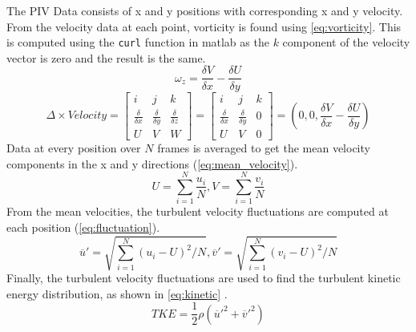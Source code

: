 The PIV Data consists of x and y positions with corresponding x and y velocity. From the velocity data at each point, vorticity is found using \autoref{eq:vorticity}. This is computed using the \verb|curl| function in \acrfull{matlab} as the $k$ component of the velocity vector is zero and the result is the same.
\begin{equation}\label{eq:vorticity}
    \omega _z = \frac{\delta V}{\delta x} - \frac{\delta U}{\delta y}
\end{equation}
\begin{equation}\label{eq:curl}
    \Delta \times Velocity = \begin{bmatrix} i & j & k \\ \frac{\delta}{\delta x} & \frac{\delta}{\delta y} & \frac{\delta}{\delta z} \\ U & V & W \end{bmatrix} = \begin{bmatrix} i & j & k \\ \frac{\delta}{\delta x} & \frac{\delta}{\delta y} & 0 \\ U & V & 0 \end{bmatrix} = (0,0,\frac{\delta V}{\delta x} - \frac{\delta U}{\delta y})
\end{equation}
Data at every position over $N$ frames is averaged to get the mean velocity components in the x and y directions (\autoref{eq:mean_velocity}). 
\begin{equation}\label{eq:mean_velocity}
    U = \sum^N_{i=1} \frac{u_i}{N}, V = \sum^N_{i=1} \frac{v_i}{N} 
\end{equation}
From the mean velocities, the turbulent velocity fluctuations are computed at each position (\autoref{eq:fluctuation}).
\begin{equation}\label{eq:fluctuation}
    \overline{u}' = \sqrt{\sum^N_{i=1}(u_i-U)^2/N},
    \overline{v}' = \sqrt{\sum^N_{i=1}(v_i-U)^2/N}
\end{equation}
Finally, the turbulent velocity fluctuations are used to find the turbulent kinetic energy distribution, as shown in \autoref{eq:kinetic} \citep{lab11-manual}.
\begin{equation}\label{eq:kinetic}
    TKE = \frac{1}{2}\rho(\overline{u}'^2 + \overline{v}'^2)
\end{equation}

